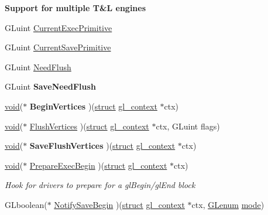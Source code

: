 \begin{Indent}\textbf{ Support for multiple T\&L engines}\par
\begin{DoxyCompactItemize}
\item 
G\+Luint \hyperlink{structdd__function__table_aa5cd1d1d6f24c6dc8cfd143e299963f5}{Current\+Exec\+Primitive}
\item 
G\+Luint \hyperlink{structdd__function__table_a80c1223fd161cbdbe0986f94eb6abe90}{Current\+Save\+Primitive}
\item 
G\+Luint \hyperlink{structdd__function__table_a3e2043e74cfdbaedd6f5885c1303b7c9}{Need\+Flush}
\item 
\mbox{\label{structdd__function__table_a946ed3ec838908b600fdaa81b57e57f1}} 
G\+Luint {\bfseries Save\+Need\+Flush}
\item 
\mbox{\label{structdd__function__table_abcff0b3a318d628573ffc676e63fb1dc}} 
\hyperlink{interfacevoid}{void}($\ast$ {\bfseries Begin\+Vertices} )(\hyperlink{interfacestruct}{struct} \hyperlink{structgl__context}{gl\+\_\+context} $\ast$ctx)
\item 
\hyperlink{interfacevoid}{void}($\ast$ \hyperlink{structdd__function__table_a3c743494ace4641ddbd61b3168fe7f96}{Flush\+Vertices} )(\hyperlink{interfacestruct}{struct} \hyperlink{structgl__context}{gl\+\_\+context} $\ast$ctx, G\+Luint flags)
\item 
\mbox{\label{structdd__function__table_af840563921ca3b3300b72df94ae6abc8}} 
\hyperlink{interfacevoid}{void}($\ast$ {\bfseries Save\+Flush\+Vertices} )(\hyperlink{interfacestruct}{struct} \hyperlink{structgl__context}{gl\+\_\+context} $\ast$ctx)
\item 
\hyperlink{interfacevoid}{void}($\ast$ \hyperlink{structdd__function__table_aca0984d93fad489005dd371c904f21de}{Prepare\+Exec\+Begin} )(\hyperlink{interfacestruct}{struct} \hyperlink{structgl__context}{gl\+\_\+context} $\ast$ctx)
\begin{DoxyCompactList}\small\item\em Hook for drivers to prepare for a gl\+Begin/gl\+End block \end{DoxyCompactList}\item 
G\+Lboolean($\ast$ \hyperlink{structdd__function__table_a539816dbcf04eeb01fa8ae6e231e97cc}{Notify\+Save\+Begin} )(\hyperlink{interfacestruct}{struct} \hyperlink{structgl__context}{gl\+\_\+context} $\ast$ctx, \hyperlink{interfacevoid}{G\+Lenum} \hyperlink{interfacevoid}{mode})

\end{DoxyCompactItemize}
\end{Indent}
